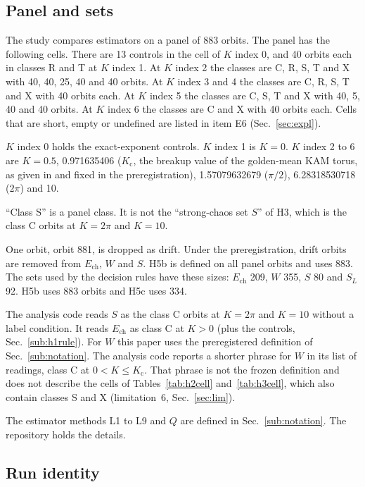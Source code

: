 \documentclass[aip,cha,reprint,amsmath,amssymb,longbibliography]{revtex4-2}
\newcommand{\Ech}{\ensuremath{E_{\mathrm{ch}}}}
\newcommand{\Kc}{\ensuremath{K_{\mathrm{c}}}}
\newcommand{\Sec}[1]{Sec.~\ref{#1}}
\begin{document}
\subsection{Panel and sets}
\label{sub:panel}

The study compares estimators on a panel of 883 orbits.
The panel has the following cells.
There are 13 controls in the cell of $K$ index 0, and 40 orbits each in classes R and T at $K$ index 1.
At $K$ index 2 the classes are C, R, S, T and X with 40, 40, 25, 40 and 40 orbits.
At $K$ index 3 and 4 the classes are C, R, S, T and X with 40 orbits each.
At $K$ index 5 the classes are C, S, T and X with 40, 5, 40 and 40 orbits.
At $K$ index 6 the classes are C and X with 40 orbits each.
Cells that are short, empty or undefined are listed in item E6 (\Sec{sec:expl}).

$K$ index 0 holds the exact-exponent controls.
$K$ index 1 is $K=0$.
$K$ index 2 to 6 are $K=0.5$, 0.971635406 ($\Kc$, the breakup value of the golden-mean KAM torus, as given in \cite{FrahmShepelyansky2010,CarlettiLaskar2000} and fixed in the preregistration), 1.57079632679 ($\pi/2$), 6.28318530718 ($2\pi$) and 10.

``Class S'' is a panel class.
It is not the ``strong-chaos set $S$'' of H3, which is the class C orbits at $K=2\pi$ and $K=10$.

One orbit, orbit 881, is dropped as drift.
Under the preregistration, drift orbits are removed from $\Ech$, $W$ and $S$.
H5b is defined on all panel orbits and uses 883.
The sets used by the decision rules have these sizes: $\Ech$ 209, $W$ 355, $S$ 80 and $S_L$ 92.
H5b uses 883 orbits and H5c uses 334.

The analysis code reads $S$ as the class C orbits at $K=2\pi$ and $K=10$ without a label condition.
It reads $\Ech$ as class C at $K>0$ (plus the controls, \Sec{sub:h1rule}).
For $W$ this paper uses the preregistered definition of \Sec{sub:notation}.
The analysis code reports a shorter phrase for $W$ in its list of readings, class C at $0<K\le\Kc$.
That phrase is not the frozen definition and does not describe the cells of Tables~\ref{tab:h2cell} and~\ref{tab:h3cell}, which also contain classes S and X (limitation~6, \Sec{sec:lim}).

The estimator methods L1 to L9 and $Q$ are defined in \Sec{sub:notation}.
The repository holds the details.

\subsection{Run identity}
\label{sub:run}
\end{document}
